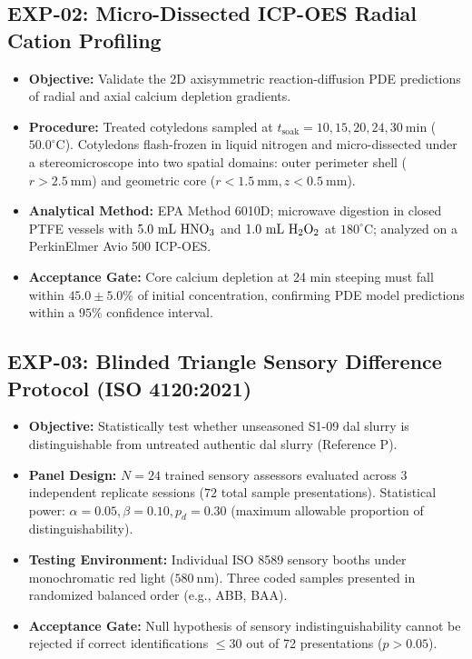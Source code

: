 \documentclass[10pt,a4paper]{article}
\begin{document}
\subsection{EXP-02: Micro-Dissected ICP-OES Radial Cation Profiling}
\begin{itemize}[leftmargin=1.5em]
    \item \textbf{Objective:} Validate the 2D axisymmetric reaction-diffusion PDE predictions of radial and axial calcium depletion gradients.
    \item \textbf{Procedure:} Treated cotyledons sampled at $t_{\mathrm{soak}} = 10, 15, 20, 24, 30\ \mathrm{min}$ ($50.0^\circ\mathrm{C}$). Cotyledons flash-frozen in liquid nitrogen and micro-dissected under a stereomicroscope into two spatial domains: outer perimeter shell ($r > 2.5\ \mathrm{mm}$) and geometric core ($r < 1.5\ \mathrm{mm}, z < 0.5\ \mathrm{mm}$).
    \item \textbf{Analytical Method:} EPA Method 6010D; microwave digestion in closed PTFE vessels with $5.0\ \mathrm{mL}\ \ce{HNO3}$ and $1.0\ \mathrm{mL}\ \ce{H2O2}$ at $180^\circ\mathrm{C}$; analyzed on a PerkinElmer Avio 500 ICP-OES.
    \item \textbf{Acceptance Gate:} Core calcium depletion at 24 min steeping must fall within $45.0 \pm 5.0\%$ of initial concentration, confirming PDE model predictions within a $95\%$ confidence interval.
\end{itemize}

\subsection{EXP-03: Blinded Triangle Sensory Difference Protocol (ISO 4120:2021)}
\begin{itemize}[leftmargin=1.5em]
    \item \textbf{Objective:} Statistically test whether unseasoned S1-09 dal slurry is distinguishable from untreated authentic dal slurry (Reference P).
    \item \textbf{Panel Design:} $N = 24$ trained sensory assessors evaluated across 3 independent replicate sessions ($72$ total sample presentations). Statistical power: $\alpha = 0.05, \beta = 0.10, p_d = 0.30$ (maximum allowable proportion of distinguishability).
    \item \textbf{Testing Environment:} Individual ISO 8589 sensory booths under monochromatic red light ($580\ \mathrm{nm}$). Three coded samples presented in randomized balanced order (e.g., ABB, BAA).
    \item \textbf{Acceptance Gate:} Null hypothesis of sensory indistinguishability cannot be rejected if correct identifications $\le 30$ out of 72 presentations ($p > 0.05$).
\end{itemize}
\end{document}
